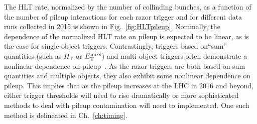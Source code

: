 The HLT rate, normalized by the number of collinding bunches, as a function of the number of pileup interactions for
each razor trigger and for different data runs collected in 2015 is
shown in Fig.~\ref{fig:HLTpileup}. Nominally, the dependence of the
normalized HLT rate on pileup is expected to be linear, as is the case
for single-object triggers. Contrastingly, triggers based on``sum'' quantities
(such as $H_\mathrm{T}$ or $E_{\mathrm{T}}^{\text{miss}}$) and multi-object triggers often
demonstrate a nonlinear dependence on pileup~\cite{Bocci:2016}. As the
razor triggers are both based on sum quantities and multiple objects,
they also exhibit some nonlinear dependence on pileup. This implies
that as the pileup increases at the LHC in 2016 and beyond, either trigger thresholds
will need to rise dramatically or more sophisticated methods to deal
with pileup contamination will need to implemented. One such method is
delineated in Ch.~\ref{ch:timing}.

